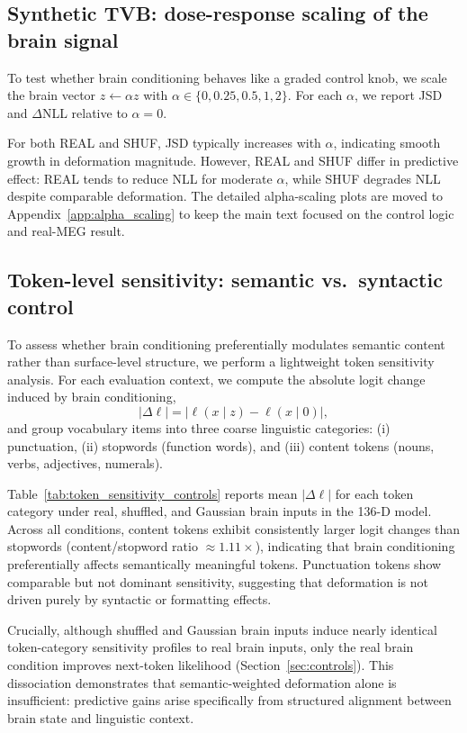 \documentclass{article}
\theoremstyle{plain}
\theoremstyle{definition}
\theoremstyle{remark}
\begin{document}
\subsection{Synthetic TVB: dose-response scaling of the brain signal}
\label{sec:scaling}

To test whether brain conditioning behaves like a graded control knob, we scale the brain vector $z \leftarrow \alpha z$ with $\alpha \in \{0,0.25,0.5,1,2\}$.
For each $\alpha$, we report JSD and $\Delta$NLL relative to $\alpha=0$.

For both REAL and SHUF, JSD typically increases with $\alpha$, indicating smooth growth in deformation magnitude.
However, REAL and SHUF differ in predictive effect: REAL tends to reduce NLL for moderate $\alpha$, while SHUF degrades NLL despite comparable deformation.
The detailed alpha-scaling plots are moved to Appendix~\ref{app:alpha_scaling} to keep the main text focused on the control logic and real-MEG result.

\subsection{Token-level sensitivity: semantic vs.\ syntactic control}

To assess whether brain conditioning preferentially modulates semantic content rather than surface-level structure, we perform a lightweight token sensitivity analysis.
For each evaluation context, we compute the absolute logit change induced by brain conditioning,
\[
|\Delta \ell| = \left| \ell(x \mid z) - \ell(x \mid 0) \right|,
\]
and group vocabulary items into three coarse linguistic categories:
(i) punctuation, (ii) stopwords (function words), and (iii) content tokens (nouns, verbs, adjectives, numerals).

Table~\ref{tab:token_sensitivity_controls} reports mean $|\Delta \ell|$ for each token category under real, shuffled, and Gaussian brain inputs in the 136-D model.
Across all conditions, content tokens exhibit consistently larger logit changes than stopwords (content/stopword ratio $\approx 1.11\times$), indicating that brain conditioning preferentially affects semantically meaningful tokens.
Punctuation tokens show comparable but not dominant sensitivity, suggesting that deformation is not driven purely by syntactic or formatting effects.

Crucially, although shuffled and Gaussian brain inputs induce nearly identical token-category sensitivity profiles to real brain inputs, only the real brain condition improves next-token likelihood (Section~\ref{sec:controls}).
This dissociation demonstrates that semantic-weighted deformation alone is insufficient: predictive gains arise specifically from structured alignment between brain state and linguistic context.
\end{document}
